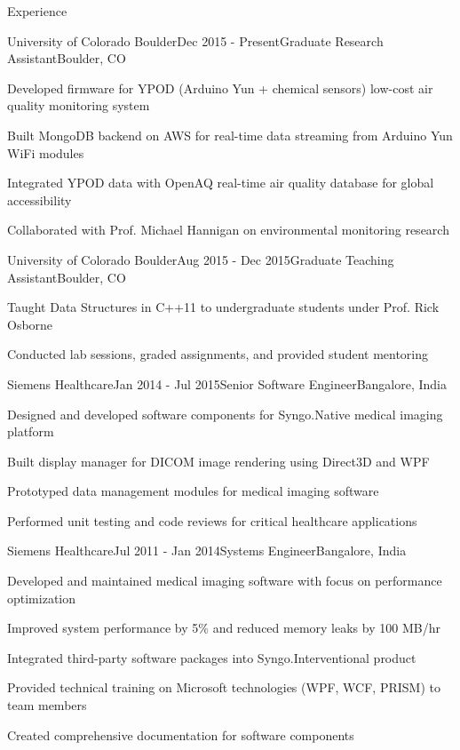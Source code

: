 \documentclass{resume}
\begin{document}
\begin{rSection}{Experience}

\begin{rSubsection}{University of Colorado Boulder}{Dec 2015 - Present}{Graduate Research Assistant}{Boulder, CO}
\item Developed firmware for YPOD (Arduino Yun + chemical sensors) low-cost air quality monitoring system
\item Built MongoDB backend on AWS for real-time data streaming from Arduino Yun WiFi modules
\item Integrated YPOD data with OpenAQ real-time air quality database for global accessibility
\item Collaborated with Prof. Michael Hannigan on environmental monitoring research
\end{rSubsection}

\begin{rSubsection}{University of Colorado Boulder}{Aug 2015 - Dec 2015}{Graduate Teaching Assistant}{Boulder, CO}
\item Taught Data Structures in C++11 to undergraduate students under Prof. Rick Osborne
\item Conducted lab sessions, graded assignments, and provided student mentoring
\end{rSubsection}

\begin{rSubsection}{Siemens Healthcare}{Jan 2014 - Jul 2015}{Senior Software Engineer}{Bangalore, India}
\item Designed and developed software components for Syngo.Native medical imaging platform
\item Built display manager for DICOM image rendering using Direct3D and WPF
\item Prototyped data management modules for medical imaging software
\item Performed unit testing and code reviews for critical healthcare applications
\end{rSubsection}

\begin{rSubsection}{Siemens Healthcare}{Jul 2011 - Jan 2014}{Systems Engineer}{Bangalore, India}
\item Developed and maintained medical imaging software with focus on performance optimization
\item Improved system performance by 5\% and reduced memory leaks by 100 MB/hr
\item Integrated third-party software packages into Syngo.Interventional product
\item Provided technical training on Microsoft technologies (WPF, WCF, PRISM) to team members
\item Created comprehensive documentation for software components
\end{rSubsection}

\end{rSection}
\end{document}
